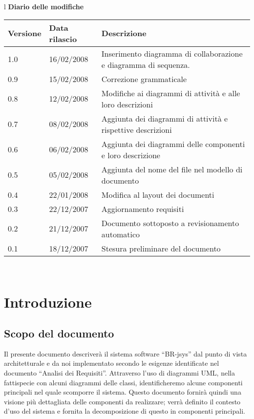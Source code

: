 \begin{center}
\begin{table}[hbtp]
\large{
\begin{tabular}{l}
\Large{\textbf{\textsf{Diario delle modifiche}}} \\
\begin{tabular}{||p{2cm}||p{3.5cm}||p{6cm}||} \hline
\textbf{Versione} & \textbf{Data rilascio} & \textbf{Descrizione} \\ \hline
1.0 & 16/02/2008 & Inserimento diagramma di collaborazione e diagramma di sequenza. \\ \hline
0.9 & 15/02/2008 & Correzione grammaticale \\ \hline
0.8 & 12/02/2008 & Modifiche ai diagrammi di attivit\`a e alle loro    descrizioni\\ \hline
0.7 & 08/02/2008 & Aggiunta dei diagrammi di attivit\`a e rispettive    descrizioni\\ \hline
0.6 & 06/02/2008 & Aggiunta dei diagrammi delle componenti e loro descrizione\\ \hline
0.5 & 05/02/2008 & Aggiunta del nome del file nel modello di documento\\ \hline
0.4 & 22/01/2008 & Modifica al layout dei documenti\\ \hline
0.3 & 22/12/2007 & Aggiornamento requisiti\\ \hline
0.2 & 21/12/2007 & Documento sottoposto a revisionamento automatico\\ \hline
0.1 & 18/12/2007 & Stesura preliminare del documento \\ \hline

\end{tabular} \\
\end{tabular}

}
\end{table}
\end{center}

\newpage

\tableofcontents

\chapter{Introduzione}
\section{Scopo del documento}
Il presente documento descriver\`a il sistema software ``BR-jsys'' dal punto di vista architetturale e da noi implementato secondo le esigenze identificate nel documento ``Analisi dei Requisiti''. Attraverso l'uso di diagrammi UML, nella fattispecie con alcuni diagrammi delle classi, identificheremo alcune componenti principali nel quale scomporre il sistema. Questo documento fornir\`a quindi una visione pi\`u dettagliata delle componenti da realizzare; verr\`a definito il contesto d'uso del sistema e fornita la decomposizione di questo in componenti principali.
